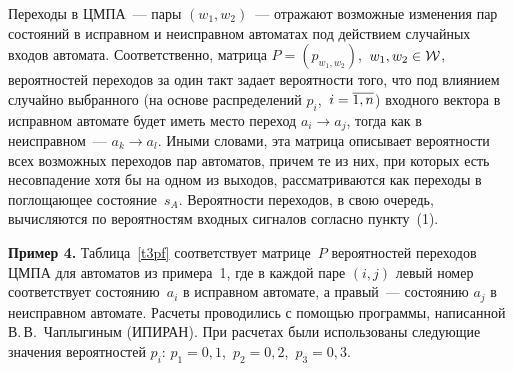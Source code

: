 \begin{multicols}{2}
 Переходы в ЦМПА~--- пары $(w_1,w_2)$~--- отражают возможные изменения
пар состояний в исправном и неисправном автоматах под действием случайных
входов автомата.
Соответственно, матрица $P = (p_{w_1,w_2})$,\ $w_1,w_2\in{\cal W}$,
вероятностей переходов за один такт
задает вероятности того, что под влиянием случайно выбранного (на основе
распределений $p_i$,\ $i=\overline{1,n}$) входного вектора в исправном автомате
будет иметь место переход $a_i\to a_j$, тогда как в неисправном~--- $a_k\to a_l$.
Иными словами, эта матрица описывает вероятности всех возможных переходов
пар автоматов, причем те из них, при которых есть несовпадение хотя бы на
одном из выходов, рассматриваются как переходы в поглощающее со\-сто\-яние~$s_A$.
Вероятности переходов, в свою очередь, вычисляются по вероятностям входных
сигналов согласно пункту~(1).

\bigskip

\noindent
 {\bf Пример 4.} Таблица~\ref{t3pf} соответствует матрице~$P$ вероятностей переходов
ЦМПА для автоматов из примера~1, где в каждой паре $(i,j)$ левый номер
соответствует со\-сто\-янию~$a_i$ в исправном автомате, а правый~--- состоянию
$a_j$ в неисправном автомате.
Расчеты проводились с помощью программы, написанной В.\,В.~Чаплыгиным (ИПИРАН).
При расчетах были использованы следующие значения вероятностей $p_i$:
$p_1 = 0{,}1$,\ $p_2 = 0{,}2$,\ $p_3 = 0{,}3$.



\end{multicols}
